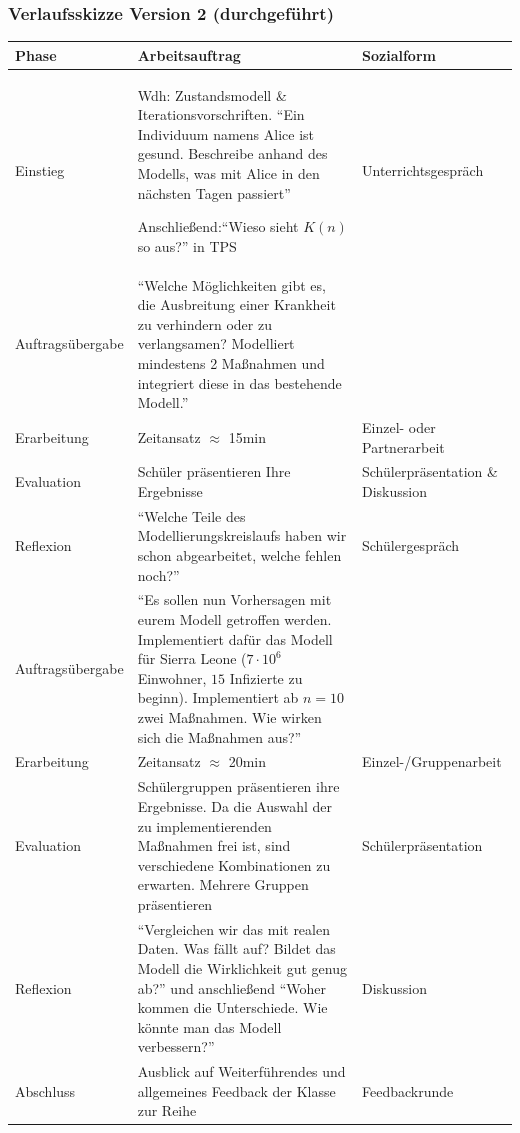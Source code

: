 \begin{landscape}
\subsubsection*{Verlaufsskizze Version 2 (durchgeführt)}
\noindent
\begin{longtable}{|C{0.3\textwidth}|L{0.8\textwidth}|L{0.4\textwidth}|}
\hline
Phase & Arbeitsauftrag & Sozialform\\
\hline\hline
\endhead
Einstieg& Wdh: Zustandsmodell \& Iterationsvorschriften. ``Ein Individuum namens Alice ist gesund. Beschreibe anhand des Modells, was mit Alice in den nächsten Tagen passiert''

Anschließend:``Wieso sieht $K(n)$ so aus?'' in TPS& Unterrichtsgespräch\\\hline
Auftragsübergabe&``Welche Möglichkeiten gibt es, die Ausbreitung einer Krankheit zu verhindern oder zu verlangsamen? Modelliert mindestens 2 Maßnahmen und integriert diese in das bestehende Modell.''&\\\hline
Erarbeitung&Zeitansatz $\approx$ 15min&Einzel- oder Partnerarbeit\\\hline
Evaluation&Schüler präsentieren Ihre Ergebnisse&Schülerpräsentation \& Diskussion\\\hline
Reflexion&``Welche Teile des Modellierungskreislaufs haben wir schon abgearbeitet, welche fehlen noch?''&Schülergespräch\\\hline
Auftragsübergabe&``Es sollen nun Vorhersagen mit eurem Modell getroffen werden. Implementiert dafür das Modell für Sierra Leone ($7\cdot 10^6$ Einwohner, $15$ Infizierte zu beginn). Implementiert ab $n=10$ zwei Maßnahmen. Wie wirken sich die Maßnahmen aus?''&\\\hline
Erarbeitung&Zeitansatz $\approx$ 20min&Einzel-/Gruppenarbeit\\\hline
Evaluation&Schülergruppen präsentieren ihre Ergebnisse. Da die Auswahl der zu implementierenden Maßnahmen frei ist, sind verschiedene Kombinationen zu erwarten. Mehrere Gruppen präsentieren&Schülerpräsentation\\\hline
Reflexion&``Vergleichen wir das mit realen Daten. Was fällt auf? Bildet das Modell die Wirklichkeit gut genug ab?'' und anschließend ``Woher kommen die Unterschiede. Wie könnte man das Modell verbessern?''&Diskussion\\\hline
Abschluss&Ausblick auf Weiterführendes und allgemeines Feedback der Klasse zur Reihe&Feedbackrunde\\\hline
\end{longtable}
\end{landscape}

